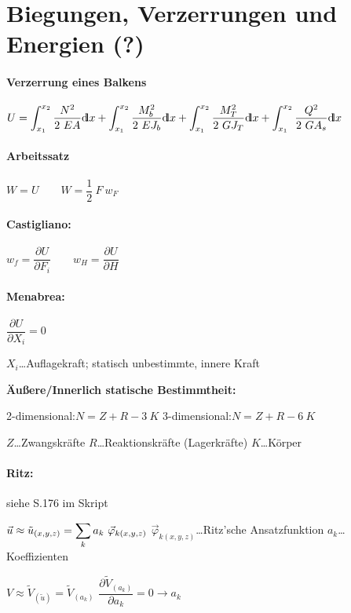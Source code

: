 
\section{Biegungen, Verzerrungen und Energien (?)}

\paragraph{ Verzerrung eines Balkens}
	$ U = \displaystyle
	      \int_{x_1}^{x_2} \dfrac{N^2}  {2\ E A}   {\operatorname{d\!l}} x
	    + \int_{x_1}^{x_2} \dfrac{M_b^2}{2\ E J_b} {\operatorname{d\!l}} x 
	    + \int_{x_1}^{x_2} \dfrac{M_T^2}{2\ G J_T} {\operatorname{d\!l}} x 
	    + \int_{x_1}^{x_2} \dfrac{Q^2}  {2\ G A_s} {\operatorname{d\!l}} x $

\paragraph{ Arbeitssatz}
	$ W = U \qquad 
		W = \dfrac{1}{2}\ F\ w_F$

\paragraph{ Castigliano:}
	$ w_f  = \dfrac{\partial U}{\partial F_i} \qquad w_H = \dfrac{\partial U}{\partial H} $
	
\paragraph{ Menabrea:}
	$ \dfrac{\partial U}{\partial X_i} = 0 $
		
		\vskip 3pt
	$ X_i $\dots Auflagekraft; statisch unbestimmte, innere Kraft
	
	\textbf{Äußere/Innerlich statische Bestimmtheit:}
	
	2-dimensional:\quad $ N = Z + R - 3\ K $
		\hfil 3-dimensional:\quad $ N = Z + R - 6\ K $ \hfil
	
	$ Z $\dots Zwangskräfte
		\qquad $ R $\dots Reaktionskräfte (Lagerkräfte)
		\qquad $ K $\dots Körper
	
\paragraph{ Ritz:} \quad siehe S.176 im Skript
	
	$ \vec{u} \approx \tilde{u}_{(x,y,z)} = \displaystyle\sum_k a_k\ \vec{\varphi}_{k(x,y,z)} $
		\qquad $ \vec{\varphi}_{k(x,y,z)} $\dots Ritz'sche Ansatzfunktion
		\qquad $ a_k $\dots Koeffizienten
	
	$ V \approx \tilde{V}_{(\tilde{u})} = \tilde{V}_{(a_k)} $
		\qquad $ \dfrac{\partial \tilde{V}_{(a_k)}}{\partial a_k} = 0 \rightarrow a_k $
